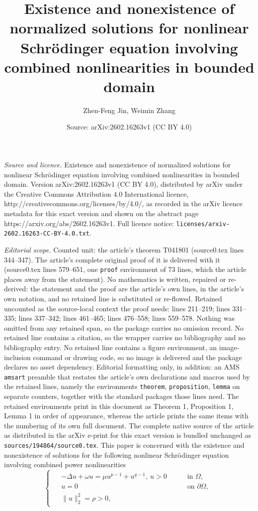 \documentclass[10pt,a4paper]{amsart}
\title{Existence and nonexistence of normalized solutions for nonlinear Schr\"{o}dinger equation involving combined nonlinearities in bounded domain}
\author{Zhen-Feng Jin, Weimin Zhang}
\date{Source: arXiv:2602.16263v1 (CC BY 4.0)}
\begin{document}
\maketitle

\noindent\emph{Source and licence.} Existence and nonexistence of normalized solutions for nonlinear Schr\"{o}dinger equation involving combined nonlinearities in bounded domain. Version arXiv:2602.16263v1 (CC BY 4.0), distributed by arXiv under the Creative Commons Attribution 4.0 International licence, http://creativecommons.org/licenses/by/4.0/, as recorded in the arXiv licence metadata for this exact version and shown on the abstract page https://arxiv.org/abs/2602.16263v1. Full licence notice: \texttt{licenses/arxiv-2602.16263-CC-BY-4.0.txt}.\par\smallskip

\noindent\textit{Editorial scope.} Counted unit: the article's theorem T041801 (source0.tex lines 344--347). The article's complete original proof of it is delivered with it (source0.tex lines 579--651, one \texttt{proof} environment of 73 lines, which the article places away from the statement). No mathematics is written, repaired or re-derived: the statement and the proof are the article's own lines, in the article's own notation, and no retained line is substituted or re-flowed.  Retained uncounted as the source-local context the proof needs: lines 211--219; lines 331--335; lines 337--342; lines 461--465; lines 476--558; lines 559--578.  Nothing was omitted from any retained span, so the package carries no omission record.  No retained line contains a citation, so the wrapper carries no bibliography and no bibliography entry.  No retained line contains a figure environment, an image-inclusion command or drawing code, so no image is delivered and the package declares no asset dependency.  Editorial formatting only, in addition: an AMS \texttt{amsart} preamble that restates the article's own declarations and macros used by the retained lines, namely the environments \texttt{theorem}, \texttt{proposition}, \texttt{lemma} on separate counters, together with the standard packages those lines need.  The retained environments print in this document as Theorem 1, Proposition 1, Lemma 1 in order of appearance, whereas the article prints the same items with the numbering of its own full document.  The complete native source of the article as distributed in the arXiv e-print for this exact version is bundled unchanged as \texttt{sources/194864/source0.tex}.
This paper is concerned with the existence and nonexistence of solutions for the following nonlinear Schr\"{o}dinger equation involving combined power nonlinearities \begin{equation}\label{041003}
\begin{cases}
\begin{aligned}
&-\Delta u+\omega u=\mu u^{p-1}+u^{q-1},~ u>0 \quad &&\text { in } \Omega, \\
&u=0  &&\text { on } \partial\Omega, \\
&\|u\|_2^2=\rho>0,
\end{aligned}
\end{cases}
\end{equation}
\end{document}
